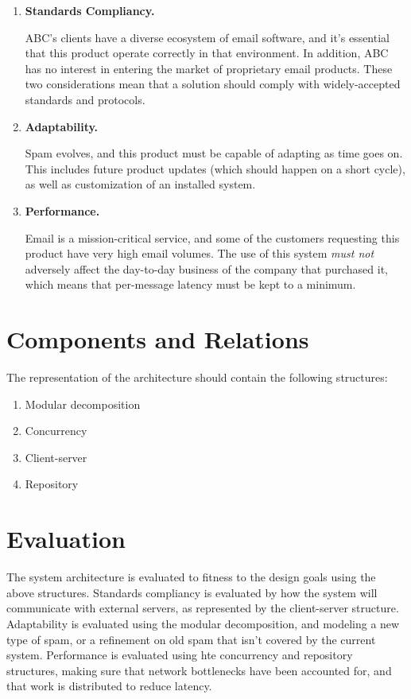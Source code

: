 \documentclass[11pt,letterpaper]{article}
\begin{document}
\begin{enumerate}
\item \textbf{Standards Compliancy.}

  ABC's clients have a diverse ecosystem of email software, and it's essential
  that this product operate correctly in that environment.  In addition, ABC
  has no interest in entering the market of proprietary email products.  These
  two considerations mean that a solution should comply with widely-accepted
  standards and protocols.

\item \textbf{Adaptability.}

  Spam evolves, and this product must be capable of adapting as time goes on.
  This includes future product updates (which should happen on a short cycle),
  as well as customization of an installed system.

\item \textbf{Performance.}

  Email is a mission-critical service, and some of the customers requesting
  this product have very high email volumes.  The use of this system
  \textit{must not} adversely affect the day-to-day business of the company
  that purchased it, which means that per-message latency must be kept to a
  minimum.  

\end{enumerate}

\section{Components and Relations}

The representation of the architecture should contain the following
structures:

\begin{enumerate}
\item Modular decomposition
\item Concurrency
\item Client-server
\item Repository
\end{enumerate}

\section{Evaluation}

The system architecture is evaluated to fitness to the design goals using the
above structures.  Standards compliancy is evaluated by how the system will
communicate with external servers, as represented by the client-server
structure.  Adaptability is evaluated using the modular decomposition, and
modeling a new type of spam, or a refinement on old spam that isn't covered by
the current system.  Performance is evaluated using hte concurrency and
repository structures, making sure that network bottlenecks have been
accounted for, and that work is distributed to reduce latency.
\end{document}
